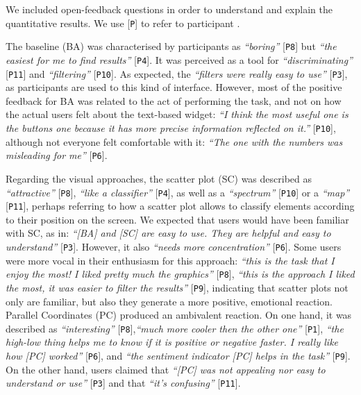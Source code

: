 \documentclass{sig-alternate}
\newcommand{\spara}[1]{\smallskip\noindent{\bf #1}}
\begin{document}
\spara{Qualitative Feedback.}
We included open-feedback questions in order to understand and explain the quantitative results. We use [\texttt{P}] to refer to participant .

The baseline (BA) was characterised by participants as \emph{``boring''} [\texttt{P8}] but \emph{``the easiest for me to find results''} [\texttt{P4}]. It was perceived as a tool for \emph{``discriminating''} [\texttt{P11}] and \emph{``filtering''} [\texttt{P10}].
As expected, the \emph{``filters were really easy to use''} [\texttt{P3}], as participants are used to this kind of interface. 
However, most of the positive feedback for BA was related to the act of performing the task, and not on how the actual users felt about the text-based widget: \emph{``I think the most useful one is the buttons one because it has more precise information reflected on it.''} [\texttt{P10}], although not everyone felt comfortable with it: \emph{``The one with the numbers was misleading for me''} [\texttt{P6}].

Regarding the visual approaches, the scatter plot (SC) was described as \emph{``attractive''} [\texttt{P8}], \emph{``like a classifier''} [\texttt{P4}], as well as a \emph{``spectrum''} [\texttt{P10}] or a \emph{``map''} [\texttt{P11}], perhaps referring to how a scatter plot allows to classify elements according to their position on the screen.
We expected that users would have been familiar with SC, as in: \emph{``[BA] and [SC] are easy to use. They are helpful and easy to understand''} [\texttt{P3}]. However, it also \emph{``needs more concentration''} [\texttt{P6}]. Some users were more vocal in their enthusiasm for this approach: \emph{``this is the task that I enjoy the most! I liked pretty much the graphics''} [\texttt{P8}], \emph{``this is the approach I liked the most, it was easier to filter the results''} [\texttt{P9}], indicating that scatter plots not only are familiar, but also they generate a more positive, emotional reaction.
Parallel Coordinates (PC) produced an ambivalent reaction. On one hand, it was described as \emph{``interesting''} [\texttt{P8}],\emph{``much more cooler then the other one''} [\texttt{P1}], \emph{``the high-low thing helps me to know if it is positive or negative faster. I really like how [PC] worked''} [\texttt{P6}], and \emph{``the sentiment indicator [PC] helps in the task''} [\texttt{P9}]. On the other hand, users claimed that \emph{``[PC] was not appealing nor easy to understand or use''} [\texttt{P3}] and that \emph{``it's confusing''} [\texttt{P11}].
\end{document}
